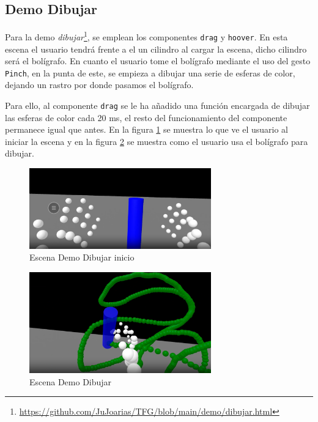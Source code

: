 \documentclass[a4paper, 12pt]{book}
\begin{document}
\subsection{Demo Dibujar}
\label{subsec:demo-dibujar}
Para la demo \textit{dibujar}\footnote{\url{https://github.com/JuJoarias/TFG/blob/main/demo/dibujar.html}}, se emplean los componentes \texttt{drag} y \texttt{hoover}. En esta escena el usuario tendrá frente a el un cilindro al cargar la escena, dicho cilindro será el bolígrafo. En cuanto el usuario tome el bolígrafo 
mediante el uso del gesto \texttt{Pinch}, en la punta de este, se empieza a dibujar una serie de esferas de color, dejando un rastro por donde pasamos el bolígrafo.

Para ello, al componente \texttt{drag} se le ha añadido una función encargada de dibujar las esferas de color cada 20 ms, el resto del funcionamiento del componente permanece igual que antes.
En la figura \ref{fig:demo_dibujar_antes} se muestra lo que ve el usuario al iniciar la escena y en la figura \ref{fig:demo_dibujar_despues} se muestra como el usuario usa el bolígrafo para dibujar.

\begin{figure}[H] 
  \centering
  \includegraphics[width=0.7\textwidth]{img/demo_dibujar_antes.png} 
  \caption{Escena Demo Dibujar inicio}
  \label{fig:demo_dibujar_antes}
\end{figure}

\begin{figure}[H] 
  \centering
  \includegraphics[width=0.7\textwidth]{img/demo_dibujar_despues.png} 
  \caption{Escena Demo Dibujar}
  \label{fig:demo_dibujar_despues}
\end{figure}
\end{document}
